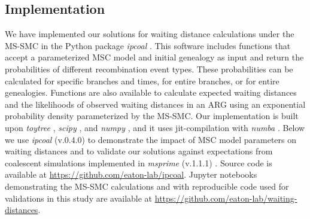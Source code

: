 \documentclass[11pt]{article}
\begin{document}
\subsection{Implementation}
We have implemented our solutions for waiting distance calculations
under the MS-SMC in the Python package \emph{ipcoal} \citep{mckenzie_ipcoal_2020}.
This software includes functions that accept a parameterized MSC model and 
initial genealogy as input and return the probabilities of different 
recombination event types. These probabilities can be calculated for specific 
branches and times, for entire branches, or for entire genealogies. 
Functions are also available to calculate expected waiting distances 
and the likelihoods of observed waiting distances in an ARG 
using an exponential probability density parameterized by the MS-SMC.
Our implementation is built upon \emph{toytree} \citep{eaton_toytree_2020}, 
\emph{scipy} \citep{2020SciPy-NMeth}, and 
\emph{numpy} \citep{harris2020array}, and it uses jit-compilation with \emph{numba} 
\citep{lam2015numba}. 
Below we use \emph{ipcoal} (v.0.4.0) to demonstrate the impact of 
MSC model parameters on waiting distances and to validate our solutions against 
expectations from coalescent simulations implemented in 
\emph{msprime} (v.1.1.1) \citep{baumdicker_efficient_2022}.
Source code is available at \url{https://github.com/eaton-lab/ipcoal}.
Jupyter notebooks demonstrating the MS-SMC calculations and with 
reproducible code used for validations in this study are available
at \url{https://github.com/eaton-lab/waiting-distances}.

\end{document}
